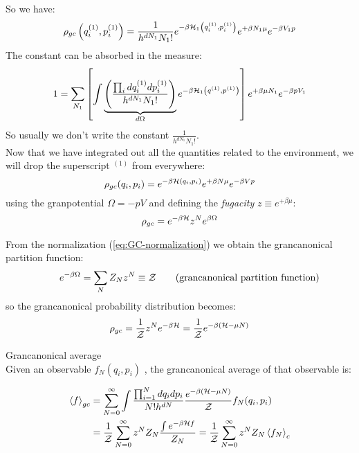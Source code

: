 So we have:
$$ \rho_{gc}\left(q_i^{(1)},p_i^{(1)}\right) = \frac 1{h^{dN_1}N_1!}e^{-\beta\mathcal{H}_1\left(q_i^{(1)},p_i^{(1)}\right)} e^{+\beta N_1\mu} e^{-\beta V_1p} $$
The constant can be absorbed in the measure:
\begin{equation} \label{eq:GC-normalization}
1 = \sum_{N_1} \left[\int\underbrace{\left(\frac{\prod_idq_i^{(1)}dp_i^{(1)}}{h^{dN_1}N_1!}\right)}_{d\Omega} e^{-\beta \mathcal{H}_1\left(q^{(1)},p^{(1)}\right)}\right] e^{+\beta \mu N_1} e^{-\beta p V_1}    
\end{equation} 
So usually we don't write the constant $\frac1{h^{dN_1}N_1!}$.\\

Now that we have integrated out all the quantities related to the environment, we will drop the superscript $^{(1)}$ from everywhere:
$$ \rho_{gc}(q_i,p_i) = e^{-\beta\mathcal{H}(q_i,p_i)} e^{+\beta N\mu} e^{-\beta V p}$$
using the granpotential $\Omega = -pV$ and defining the \textit{fugacity} $z \equiv e^{+\beta \mu}$:
$$\rho_{gc} = e^{-\beta\mathcal{H}} z^N e^{\beta \Omega}$$

From the normalization (\ref{eq:GC-normalization}) we obtain the grancanonical partition function:
$$\qquad e^{-\beta \Omega} = \sum_N Z_N z^N \equiv \mathcal{Z} \qquad \text{(grancanonical partition function)}$$
so the grancanonical probability distribution becomes:
$$\rho_{gc} = \frac1{\mathcal{Z}} z^Ne^{-\beta\mathcal{H}} = \frac 1{\mathcal{Z}} e^{-\beta(\mathcal{H} -\mu N)}$$


\Def Grancanonical average\\
Given an observable $f_N(q_i,p_i)$ , the grancanonical average of that observable is:

\begin{align*}
\left<f\right>_{gc} &= \sum_{N=0}^\infty \int \frac{\prod_{i=1}^N dq_idp_i}{N! h^{dN}}\frac{e^{-\beta(\mathcal{H} -\mu N)}}{\mathcal{Z}} f_N(q_i,p_i) \\
&= \frac 1{\mathcal{Z}} \sum_{N=0}^\infty z^N Z_N \frac{\int e^{-\beta\mathcal{H} f}}{Z_N} = \frac 1{\mathcal{Z}} \sum_{N=0}^\infty z^N Z_N \left<f_N\right>_c
\end{align*}

